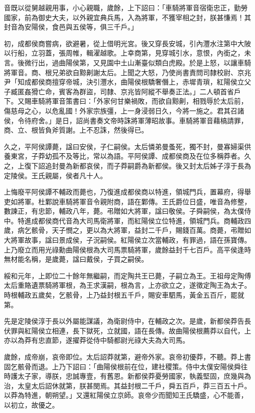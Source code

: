 \begin{pinyinscope}
音既以從舅越親用事，小心親職，歲餘，上下詔曰：「車騎將軍音宿衛忠正，勤勞國家，前為御史大夫，以外親宜典兵馬，入為將軍，不獲宰相之封，朕甚慊焉！其封音為安陽侯，食邑與五侯等，俱三千戶。」

初，成都侯商嘗病，欲避暑，從上借明光宮。後又穿長安城，引內灃水注第中大陂以行船，立羽蓋，張周帷，輯濯越歌。上幸商第，見穿城引水，意恨，內銜之，未言。後微行出，過曲陽侯第，又見園中土山漸臺似類白虎殿。於是上怒，以讓車騎將軍音。商、根兄弟欲自黥劓謝太后。上聞之大怒，乃使尚書責問司隸校尉、京兆尹「知成都侯商擅穿帝城，決引灃水，曲陽侯根驕奢僭上，赤墀青瑣，紅陽侯立父子臧匿姦猾亡命，賓客為群盜，司隸、京兆皆阿縱不舉奏正法。」二人頓首省戶下。又賜車騎將軍音策書曰：「外家何甘樂禍敗，而欲自黥劓，相戮辱於太后前，傷慈母之心，以危亂國！外家宗族彊，上一身浸弱日久，今將一施之。君其召諸侯，令待府舍。」是日，詔尚書奏文帝時誅將軍薄昭故事。車騎將軍音藉槁請罪，商、立、根皆負斧質謝。上不忍誅，然後得已。

久之，平阿侯譚薨，諡曰安侯，子仁嗣侯。太后憐弟曼蚤死，獨不封，曼寡婦渠供養東宮，子莽幼孤不及等比，常以為語。平阿侯譚、成都侯商及在位多稱莽者。久之，上復下詔追封曼為新都哀侯，而子莽嗣爵為新都侯。後又封太后姊子淳于長為定陵侯。王氏親屬，侯者凡十人。

上悔廢平阿侯譚不輔政而薨也，乃復進成都侯商以特進，領城門兵，置幕府，得舉吏如將軍。杜鄴說車騎將軍音令親附商，語在鄴傳。王氏爵位日盛，唯音為修整，數諫正，有忠節，輔政八年，薨。弔贈如大將軍，諡曰敬侯。子舜嗣侯，為太僕侍中。特進成都侯商代音為大司馬衛將軍，而紅陽侯立位特進，領城門兵。商輔政四歲，病乞骸骨，天子憫之，更以為大將軍，益封二千戶，賜錢百萬。商薨，弔贈如大將軍故事，諡曰景成侯，子況嗣侯。紅陽侯立次當輔政，有罪過，語在孫寶傳。上乃廢立而用光祿勳曲陽侯根為大司馬票騎將軍，歲餘益封千七百戶。高平侯逢時無材能名稱，是歲薨，諡曰戴侯，子買之嗣侯。

綏和元年，上即位二十餘年無繼嗣，而定陶共王已薨，子嗣立為王。王祖母定陶傅太后重賂遺票騎將軍根，為王求漢嗣，根為言，上亦欲立之，遂徵定陶王為太子。時根輔政五歲矣，乞骸骨，上乃益封根五千戶，賜安車駟馬，黃金五百斤，罷就第。

先是定陵侯淳于長以外屬能謀議，為衛尉侍中，在輔政之次。是歲，新都侯莽告長伏罪與紅陽侯立相連，長下獄死，立就國，語在長傳。故曲陽侯根薦莽以自代，上亦以為莽有忠直節，遂擢莽從侍中騎都尉光祿大夫為大司馬。

歲餘，成帝崩，哀帝即位。太后詔莽就第，避帝外家。哀帝初優莽，不聽。莽上書固乞骸骨而退。上乃下詔曰：「曲陽侯根前在位，建社稷策。侍中太僕安陽侯舜往時護太子家，導朕，忠誠專壹，有舊恩。新都侯莽憂勞國家，執義堅固，庶幾與為治，太皇太后詔休就第，朕甚閔焉。其益封根二千戶，舜五百戶，莽三百五十戶。以莽為特進，朝朔望。」又還紅陽侯立京師。哀帝少而聞知王氏驕盛，心不能善，以初立，故優之。


\end{pinyinscope}
